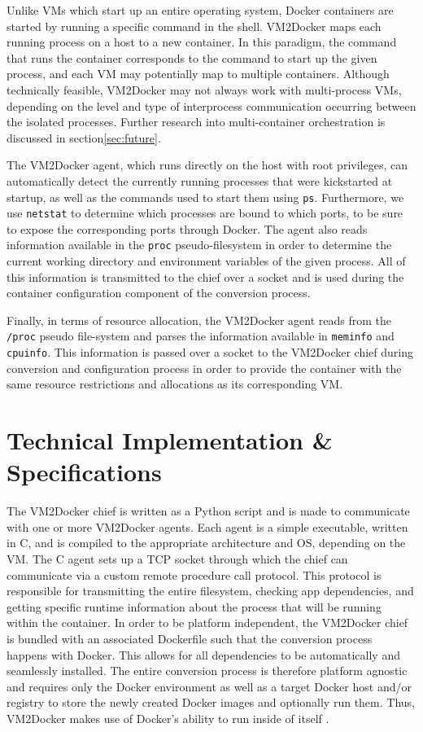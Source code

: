 Unlike VMs which start up an entire operating system, Docker containers are started by running a specific command in the shell. VM2Docker maps each running process on a host to a new container. In this paradigm, the command that runs the container corresponds to the command to start up the given process, and each VM may potentially map to multiple containers. Although technically feasible, VM2Docker may not always work with multi-process VMs, depending on the level and type of interprocess communication occurring between the isolated processes. Further research into multi-container orchestration is discussed in section\ref{sec:future}.

The VM2Docker agent, which runs directly on the host with root privileges, can automatically detect the currently running processes that were kickstarted at startup, as well as the commands used to start them using \texttt{ps}. Furthermore, we use \texttt{netstat} to determine which processes are bound to which ports, to be sure to expose the corresponding ports through Docker. The agent also reads information available in the \texttt{proc} pseudo-filesystem in order to determine the current working directory and environment variables of the given process. All of this information is transmitted to the chief over a socket and is used during the container configuration component of the conversion process.

Finally, in terms of resource allocation, the VM2Docker agent reads from the \texttt{/proc} pseudo file-system and parses the information available in \texttt{meminfo} and \texttt{cpuinfo}. This information is passed over a socket to the VM2Docker chief during conversion and configuration process in order to provide the container with the same resource restrictions and allocations as its corresponding VM.

\section{Technical Implementation \& Specifications}
\label{sec:techspecs}
The VM2Docker chief is written as a Python script and is made to communicate with one or more VM2Docker agents. Each agent is a simple executable, written in C, and is compiled to the appropriate architecture and OS, depending on the VM. The C agent sets up a TCP socket through which the chief can communicate via a custom remote procedure call protocol. This protocol is responsible for transmitting the entire filesystem, checking app dependencies, and getting specific runtime information about the process that will be running within the container. In order to be platform independent, the VM2Docker chief is bundled with an associated Dockerfile such that the conversion process happens with Docker. This allows for all dependencies to be automatically and seamlessly installed. The entire conversion process is therefore platform agnostic and requires only the Docker environment as well as a target Docker host and/or registry to store the newly created Docker images and optionally run them. Thus, VM2Docker makes use of Docker's ability to run inside of itself \cite{dockerindocker}.
